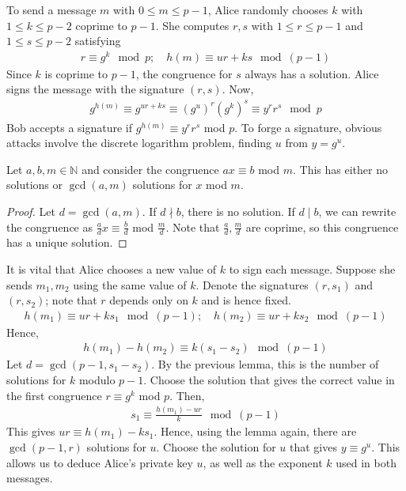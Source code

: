To send a message $m$ with $0 \leq m \leq p-1$, Alice randomly chooses $k$ with $1 \leq k \leq p-2$ coprime to $p-1$.
She computes $r, s$ with $1 \leq r \leq p-1$ and $1 \leq s \leq p-2$ satisfying
\begin{align*}
    r \equiv g^k \mod p;\quad h(m) \equiv ur + ks \mod (p-1)
\end{align*}
Since $k$ is coprime to $p-1$, the congruence for $s$ always has a solution.
Alice signs the message with the signature $(r, s)$.
Now,
\begin{align*}
    g^{h(m)} \equiv g^{ur + ks} \equiv (g^u)^r (g^k)^s \equiv y^r r^s \mod p
\end{align*}
Bob accepts a signature if $g^{h(m)} \equiv y^r r^s$ mod $p$.
To forge a signature, obvious attacks involve the discrete logarithm problem, finding $u$ from $y = g^u$.
\begin{lemma}
    Let $a, b, m \in \mathbb N$ and consider the congruence $ax \equiv b$ mod $m$.
    This has either no solutions or $\gcd(a,m)$ solutions for $x$ mod $m$.
\end{lemma}
\begin{proof}
    Let $d = \gcd(a,m)$.
    If $d \nmid b$, there is no solution.
    If $d \mid b$, we can rewrite the congruence as $\frac{a}{d} x \equiv \frac{b}{d}$ mod $\frac{m}{d}$.
    Note that $\frac{a}{d}, \frac{m}{d}$ are coprime, so this congruence has a unique solution.
\end{proof}
It is vital that Alice chooses a new value of $k$ to sign each message.
Suppose she sends $m_1, m_2$ using the same value of $k$.
Denote the signatures $(r, s_1)$ and $(r, s_2)$; note that $r$ depends only on $k$ and is hence fixed.
\begin{align*}
    h(m_1) \equiv ur + ks_1 \mod (p-1);\quad h(m_2) \equiv ur + ks_2 \mod (p-1)
\end{align*}
Hence,
\begin{align*}
    h(m_1) - h(m_2) \equiv k(s_1 - s_2) \mod (p-1)
\end{align*}
Let $d = \gcd(p-1, s_1 - s_2)$.
By the previous lemma, this is the number of solutions for $k$ modulo $p-1$.
Choose the solution that gives the correct value in the first congruence $r \equiv g^k$ mod $p$.
Then,
\begin{align*}
    s_1 \equiv \frac{h(m_1) - ur}{k} \mod (p-1)
\end{align*}
This gives $ur \equiv h(m_1) - ks_1$.
Hence, using the lemma again, there are $\gcd(p-1, r)$ solutions for $u$.
Choose the solution for $u$ that gives $y \equiv g^u$.
This allows us to deduce Alice's private key $u$, as well as the exponent $k$ used in both messages.

